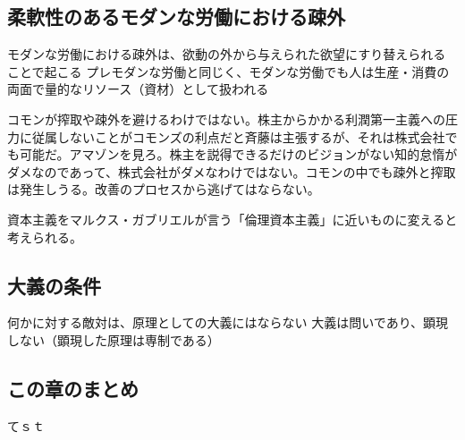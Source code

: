 \subsection{柔軟性のあるモダンな労働における疎外}\label{ux67d4ux8edfux6027ux306eux3042ux308bux30e2ux30c0ux30f3ux306aux52b4ux50cdux306bux304aux3051ux308bux758eux5916}

モダンな労働における疎外は、欲動の外から与えられた欲望にすり替えられることで起こる
プレモダンな労働と同じく、モダンな労働でも人は生産・消費の両面で量的なリソース（資材）として扱われる

コモンが搾取や疎外を避けるわけではない。株主からかかる利潤第一主義への圧力に従属しないことがコモンズの利点だと斉藤は主張するが、それは株式会社でも可能だ。アマゾンを見ろ。株主を説得できるだけのビジョンがない知的怠惰がダメなのであって、株式会社がダメなわけではない。コモンの中でも疎外と搾取は発生しうる。改善のプロセスから逃げてはならない。

資本主義をマルクス・ガブリエルが言う「倫理資本主義」に近いものに変えると考えられる。

\subsection{大義の条件}\label{ux5927ux7fa9ux306eux6761ux4ef6}

何かに対する敵対は、原理としての大義にはならない
大義は問いであり、顕現しない（顕現した原理は専制である）

\subsection{この章のまとめ}\label{ux3053ux306eux7ae0ux306eux307eux3068ux3081}

てｓｔ
